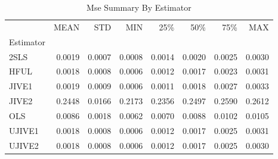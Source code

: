 \begin{table}[ht]
\centering
\caption{Mse Summary By Estimator}
\begin{tabular}{lrrrrrrr}
\toprule
 & MEAN & STD & MIN & 25\% & 50\% & 75\% & MAX \\
Estimator &  &  &  &  &  &  &  \\
\midrule
2SLS & 0.0019 & 0.0007 & 0.0008 & 0.0014 & 0.0020 & 0.0025 & 0.0030 \\
HFUL & 0.0018 & 0.0008 & 0.0006 & 0.0012 & 0.0017 & 0.0023 & 0.0031 \\
JIVE1 & 0.0019 & 0.0009 & 0.0006 & 0.0011 & 0.0018 & 0.0027 & 0.0033 \\
JIVE2 & 0.2448 & 0.0166 & 0.2173 & 0.2356 & 0.2497 & 0.2590 & 0.2612 \\
OLS & 0.0086 & 0.0018 & 0.0062 & 0.0070 & 0.0088 & 0.0102 & 0.0105 \\
UJIVE1 & 0.0018 & 0.0008 & 0.0006 & 0.0012 & 0.0017 & 0.0025 & 0.0031 \\
UJIVE2 & 0.0018 & 0.0008 & 0.0006 & 0.0012 & 0.0017 & 0.0025 & 0.0030 \\
\bottomrule
\end{tabular}
\end{table}
